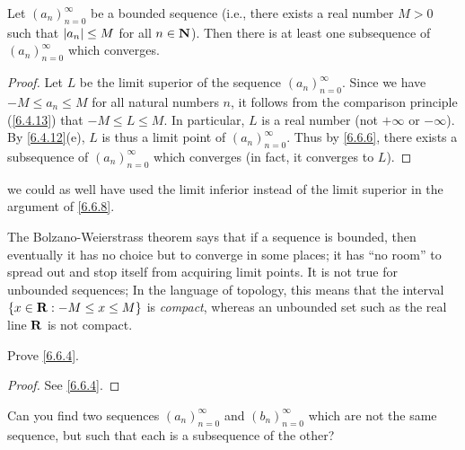 \begin{theorem}\label{6.6.8}
  Let \((a_n)_{n = 0}^\infty\) be a bounded sequence
  (i.e., there exists a real number \(M > 0\) such that \(\left\lvert a_n\right\rvert \leq M\) for all \(n \in \mathbf{N}\)).
  Then there is at least one subsequence of \((a_n)_{n = 0}^\infty\) which converges.
\end{theorem}

\begin{proof}
  Let \(L\) be the limit superior of the sequence \((a_n)_{n = 0}^\infty\).
  Since we have \(-M \leq a_n \leq M\) for all natural numbers \(n\), it follows from the comparison principle (\cref{6.4.13}) that \(-M \leq L \leq M\).
  In particular, \(L\) is a real number (not \(+\infty\) or \(-\infty\)).
  By \cref{6.4.12}(e), \(L\) is thus a limit point of \((a_n)_{n = 0}^\infty\).
  Thus by \cref{6.6.6}, there exists a subsequence of \((a_n)_{n = 0}^\infty\) which converges
  (in fact, it converges to \(L\)).
\end{proof}

\begin{note}
  we could as well have used the limit inferior instead of the limit superior in the argument of \cref{6.6.8}.
\end{note}

\begin{remark}\label{6.6.9}
  The Bolzano-Weierstrass theorem says that if a sequence is bounded, then eventually it has no choice but to converge in some places;
  it has ``no room'' to spread out and stop itself from acquiring limit points.
  It is not true for unbounded sequences;
  In the language of topology, this means that the interval \(\{x \in \mathbf{R} : -M \leq x \leq M\}\) is \emph{compact}, whereas an unbounded set such as the real line \(\mathbf{R}\) is not compact.
\end{remark}

\exercisesection

\begin{exercise}\label{ex 6.6.1}
  Prove \cref{6.6.4}.
\end{exercise}

\begin{proof}
  See \cref{6.6.4}.
\end{proof}

\begin{exercise}\label{ex 6.6.2}
  Can you find two sequences \((a_n)_{n = 0}^\infty\) and \((b_n)_{n = 0}^\infty\) which are not the same sequence, but such that each is a subsequence of the other?
\end{exercise}

